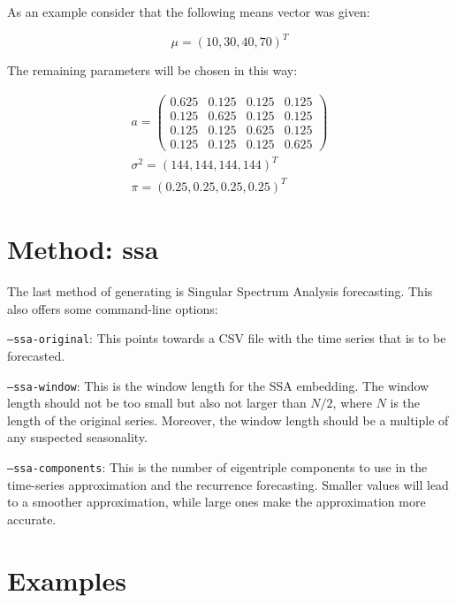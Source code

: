 As an example consider that the following means vector was given: 

\begin{equation}
    \mu = (10, 30, 40, 70)^T
\end{equation}

The remaining parameters will be chosen in this way:

\begin{equation}
    \begin{split}
    a = 
    \begin{pmatrix}
        0.625 & 0.125 & 0.125 & 0.125 \\
        0.125 & 0.625 & 0.125 & 0.125 \\
        0.125 & 0.125 & 0.625 & 0.125 \\
        0.125 & 0.125 & 0.125 & 0.625
    \end{pmatrix} \\
    \sigma^2 = (144, 144, 144, 144)^T \\
    \pi = (0.25, 0.25, 0.25, 0.25)^T 
\end{split}
\end{equation}

\section{Method: ssa}

The last method of generating is Singular Spectrum Analysis forecasting. This also offers some command-line options: 

\texttt{---ssa-original}: This points towards a CSV file with the time series that is to be forecasted. 

\texttt{---ssa-window}: This is the window length for the SSA embedding. The window length should not be too small but also not larger than $N/2$, where $N$ is the length of the original series. Moreover, the window length should be a multiple of any suspected seasonality.

\texttt{---ssa-components}: This is the number of eigentriple components to use in the time-series approximation and the recurrence forecasting. Smaller values will lead to a smoother approximation, while large ones make the approximation more accurate. 

\section{Examples}

